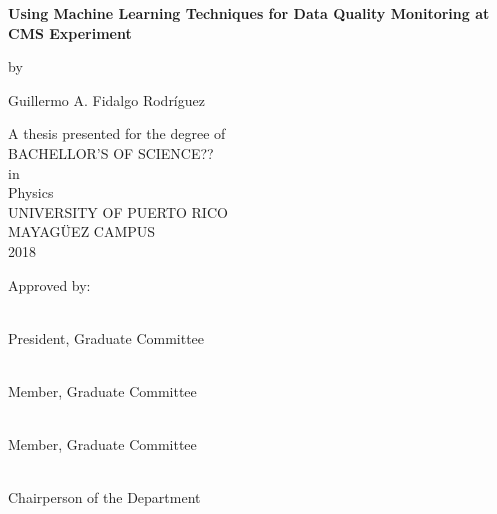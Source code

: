\begin{titlepage}
    \begin{center}
    
       \BgThispage
        \vspace*{1cm}
      \Large  
        \textbf{Using Machine Learning Techniques for Data Quality Monitoring at CMS Experiment}
        
        \normalsize
        \vspace{0.5cm}
        by
        
        \vspace{0.25cm}
        
        Guillermo A. Fidalgo Rodríguez         
        \vspace{0.5cm}	
        
        A thesis presented for the degree of\\
        \vspace{0.5cm}
        BACHELLOR'S  OF SCIENCE??\\
        \vspace{0.5cm}
        in\\
        \vspace{0.5cm}
        Physics\\
        \vspace{0.5cm}
        UNIVERSITY OF PUERTO RICO\\
        MAYAGÜEZ CAMPUS\\
        2018
        \vspace{0.8cm}
        
        \end{center}
        
        Approved by:
        
        \vspace{1.0cm}

\\President, Graduate Committee

\vspace{1.0cm}

\\Member, Graduate Committee

\vspace{1.0cm}

\\Member, Graduate Committee

\vspace{1.0cm}

\\Chairperson of the Department



\end{titlepage}
